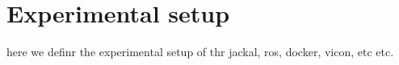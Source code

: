 \section{Experimental setup}
\label{expset}

here we definr the experimental setup of thr jackal, ros, docker, vicon, etc etc.

